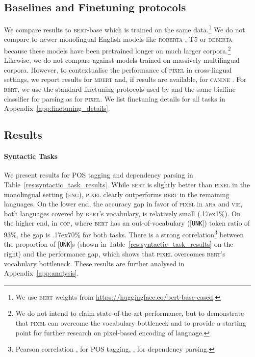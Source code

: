 \documentclass{article}
\newcommand{\model}{\textsc{pixel}\xspace}
\newcommand{\arabi}{\textsc{ara}\xspace}
\newcommand{\english}{\textsc{eng}\xspace}
\newcommand{\coptic}{\textsc{cop}\xspace}
\newcommand{\vietnamese}{\textsc{vie}\xspace}
\newcommand{\circa}{{\raise.17ex\hbox{}}}
\begin{document}
\subsection{Baselines and Finetuning protocols}
\vspace{-2mm}

We compare results to \textsc{bert}-base which is trained on the same data.\footnote{We use \textsc{bert} weights from \url{https://huggingface.co/bert-base-cased}.} We do not compare to newer monolingual English models like \textsc{roberta} \citep{DBLP:journals/corr/abs-1907-11692}, \textsc{T5} \citep{raffel-etal-2020-t5} or \textsc{deberta} \citep{he-etal-2020-deberta, he-etal-2021-debertav3} because these models have been pretrained longer on much larger corpora.\footnote{We do not intend to claim state-of-the-art performance, but to demonstrate that \model can overcome the vocabulary bottleneck and to provide a starting point for further research on pixel-based encoding of language.} 
Likewise, we do not compare against models trained on massively multilingual corpora.
However, to contextualise the performance of \model in cross-lingual settings, we report results for \textsc{mbert} and, if results are available, for \textsc{canine} \citep{DBLP:journals/tacl/ClarkGTW22}. For \textsc{bert}, we use the standard finetuning protocols used by \cite{devlin-etal-2019-bert} and the same biaffine classifier for parsing as for \model. We list finetuning details for all tasks in Appendix~\ref{app:finetuning_details}.

\vspace{-2mm}
\subsection{Results}
\label{sec:results}
\vspace{-2mm}

\paragraph{Syntactic Tasks} We present results for POS tagging and dependency parsing in Table~\ref{res:syntactic_task_results}. While \textsc{bert} is slightly better than \model in the monolingual setting (\english), \model clearly outperforms \textsc{bert} in the remaining languages. On the lower end, the accuracy gap in favor of \model in \arabi and \vietnamese, both languages covered by \textsc{bert}'s vocabulary, is relatively small (\circa1\%). On the higher end, in \coptic, where \textsc{bert} has an out-of-vocabulary ({\footnotesize{[\texttt{UNK}]}}) token ratio of 93\%, the gap is \circa70\% for both tasks. There is a strong correlation\footnote{Pearson correlation ,  for POS tagging, ,  for dependency parsing.} between the proportion of {\footnotesize{[\texttt{UNK}]}}s (shown in Table~\ref{res:syntactic_task_results} on the right) and the performance gap, which shows that \model overcomes \textsc{bert}'s vocabulary bottleneck. These results are further analysed in Appendix~\ref{app:analysis}.
\end{document}

